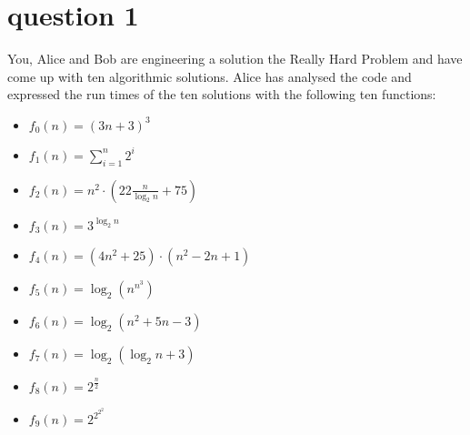 \section{question 1}
You, Alice and Bob are engineering a solution the Really Hard Problem and have come up with ten algorithmic solutions. Alice has analysed the code and expressed the run times of the ten solutions with the following ten functions:

\begin{itemize}
    \item $f_0(n) = (3n + 3)^3$ 
    \item $f_1(n) = \sum_{i=1}^n2^i$  
    \item $f_2(n) = n^2\cdot(22\frac{n}{\log_2n} + 75)$ 
    \item $f_3(n) = 3^{\log_2n}$
    \item $f_4(n) = (4n^2+25)\cdot(n^2-2n+1)$
    \item $f_5(n) = \log_2\left(n^{n^3}\right)$
    \item $f_6(n) = \log_2\left(n^2 + 5n - 3\right)$
    \item $f_7(n) = \log_2\left(\log_2n + 3\right)$
    \item $f_8(n) = 2^{\frac{n}{2}}$
    \item $f_9(n) = 2^{2^{2^2}}$
\end{itemize}
